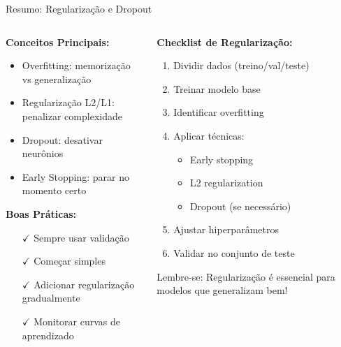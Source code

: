 \documentclass[xcolor=dvipsnames,t,aspectratio=169]{beamer}
\newcommand{\highlight}[1]{{\color{nes_dark_orange} #1}}
\begin{document}
\begin{frame}[c]{Resumo: Regularização e Dropout}
    \begin{columns}[c]
        \begin{column}{0.5\textwidth}
            \textbf{Conceitos Principais:}
            \begin{itemize}
                \item \highlight{Overfitting}: memorização vs generalização
                \item \highlight{Regularização L2/L1}: penalizar complexidade
                \item \highlight{Dropout}: desativar neurônios
                \item \highlight{Early Stopping}: parar no momento certo
            \end{itemize}
            
            \vspace{0.5cm}
            \textbf{Boas Práticas:}
            \begin{itemize}
                \item[$\checkmark$] Sempre usar validação
                \item[$\checkmark$] Começar simples
                \item[$\checkmark$] Adicionar regularização gradualmente
                \item[$\checkmark$] Monitorar curvas de aprendizado
            \end{itemize}
        \end{column}
        \begin{column}{0.5\textwidth}
            \textbf{Checklist de Regularização:}
            \begin{enumerate}
                \item Dividir dados (treino/val/teste)
                \item Treinar modelo base
                \item Identificar overfitting
                \item Aplicar técnicas:
                \begin{itemize}
                    \item Early stopping
                    \item L2 regularization
                    \item Dropout (se necessário)
                \end{itemize}
                \item Ajustar hiperparâmetros
                \item Validar no conjunto de teste
            \end{enumerate}
            
            \vspace{0.3cm}
            \highlight{Lembre-se:} Regularização é essencial para modelos que generalizam bem!
        \end{column}
    \end{columns}
\end{frame}
\end{document}
